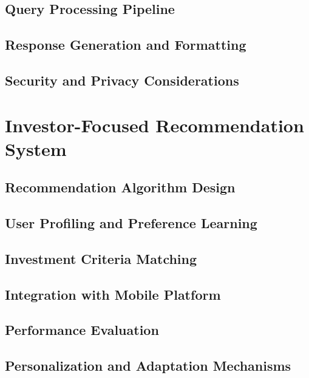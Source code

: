 \subsection{Query Processing Pipeline}
\subsection{Response Generation and Formatting}
\subsection{Security and Privacy Considerations}

\section{Investor-Focused Recommendation System}
\subsection{Recommendation Algorithm Design}
\subsection{User Profiling and Preference Learning}
\subsection{Investment Criteria Matching}
\subsection{Integration with Mobile Platform}
\subsection{Performance Evaluation}
\subsection{Personalization and Adaptation Mechanisms}





